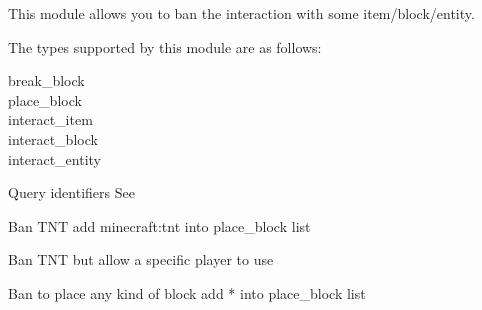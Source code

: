 
This module allows you to ban the interaction with some item/block/entity.

The types supported by this module are as follows:
\begin{description}
    \item [break\_block]
    \item [place\_block]
    \item [interact\_item]
    \item [interact\_block]
    \item [interact\_entity]
\end{description}

\begin{tips}{Query identifiers}
    See~
\end{tips}

\begin{example}{Ban TNT}
    add minecraft:tnt into place\_block list
\end{example}

\begin{example}{Ban TNT but allow a specific player to use}
\end{example}

\begin{example}{Ban to place any kind of block}
    add * into place\_block list
\end{example}

